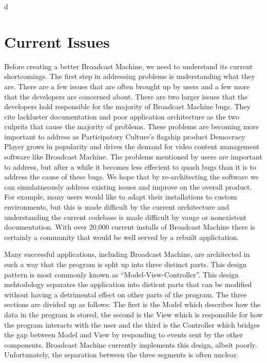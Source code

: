 d\documentclass[a4paper,12pt]{report}
\begin{document}
{{\chapter{Current Issues}

Before creating a better Broadcast Machine, we need to understand its current shortcomings.
The first step in addressing problems is understanding what they are. There are a few issues that are often brought up by users and a few more that the developers are concerned about.
There are two larger issues that the developers hold responsible for the majority of Broadcast Machine bugs.
They cite  lackluster documentation and poor application architecture as the two culprits that cause the majority of problems. These problems are becoming more important to address as Participatory Culture's flagship product Democracy Player grows in popularity and drives the demand for video content management software like Broadcast Machine. The problems mentioned by users are important to address, but after a while it becomes less effecient to quash bugs than it is to address the cause of these bugs. We hope that by re-architecting the software we can simulatneously address existing issues and improve on the overall product.
For example, many users would like to adapt their installations to custom environments, but this is made difficult by the current architecture and understanding the current codebase is made difficult by vauge or nonexistent documentation. With over 20,000 current installs of Broadcast Machine there is certainly a community that would be well served by a rebuilt applictation. \footnotemark

Many successful applications, including Broadcast Machine, are architected in such a way that the program is split up into three distinct parts. This design pattern is most commonly known as ``Model-View-Controller''. This design mehtodology separates the application into disticnt parts that can be modified without having a detrimental effect on other parts of the program. The three sections are divided up as follows: The first is the Model which describes how the data in the program is stored, the second is the View which is responsible for how the program interacts with the user and the third is the Controller which bridges the gap between Model and View by responding to events sent by the other components. Broadcast Machine currently implements this design, albeit poorly. Unfortunately, the separation between the three segments is often unclear.

}}
\end{document}
